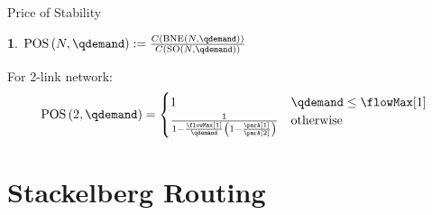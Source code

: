\documentclass[xcolor=svgnames, english, smaller]{beamer}
\theoremstyle{plain}
\theoremstyle{definition}
\newtheorem{defn}[thm]{\protect\definitionname}
\theoremstyle{plain}
\theoremstyle{plain}
\providecommand{\definitionname}{Definition}
\begin{document}
\begin{frame}{Price of Stability}

\begin{defn}
$\textup{POS}\left( \NLinks, \qdemand \right) := \frac{C\left(\BestNashEquilibrium{\NLinks}{ \qdemand}\right)}{C\left(\textup{SO}\left(\NLinks, \qdemand\right)\right)}$
\end{defn}

For 2-link network:
\begin{equation}
\textup{POS}\left(2,\qdemand\right) = 
\begin{cases}
1 & \qdemand \le \flowMax[1] \\
\frac{1}{1-\frac{\flowMax[1]}{\qdemand}\left(1-\frac{\parA[1]}{\parA[2]}\right)} & \text{otherwise}
\end{cases}
\end{equation}

\begin{figure}
\begin{centering}
\end{centering}
\end{figure}

\end{frame}


\section{Stackelberg Routing}
\end{document}
